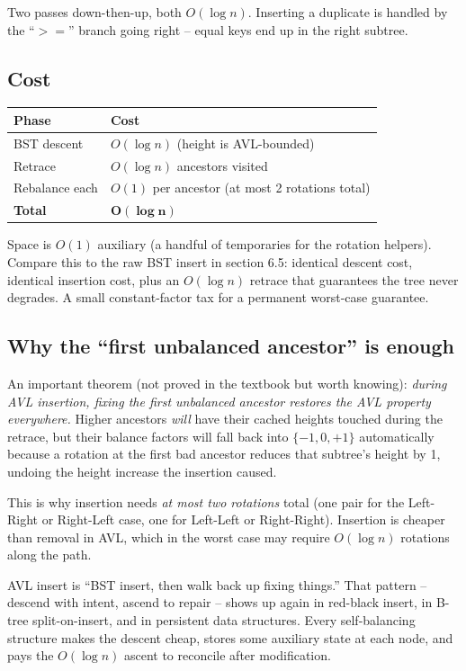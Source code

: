 \documentclass[11pt]{article}
\begin{document}
Two passes down-then-up, both $O(\log n)$. Inserting a duplicate is handled by the ``$>=$'' branch going right -- equal keys end up in the right subtree.

\subsection*{Cost}

\begin{center}
\begin{tabular}{ll}
Phase          & Cost \\
\hline
BST descent    & $O(\log n)$ (height is AVL-bounded) \\
Retrace        & $O(\log n)$ ancestors visited \\
Rebalance each & $O(1)$ per ancestor (at most 2 rotations total) \\
\hline
\textbf{Total} & $\mathbf{O(\log n)}$ \\
\end{tabular}
\end{center}

Space is $O(1)$ auxiliary (a handful of temporaries for the rotation helpers). Compare this to the raw BST insert in section 6.5: identical descent cost, identical insertion cost, plus an $O(\log n)$ retrace that guarantees the tree never degrades. A small constant-factor tax for a permanent worst-case guarantee.

\subsection*{Why the ``first unbalanced ancestor'' is enough}

An important theorem (not proved in the textbook but worth knowing): \emph{during AVL insertion, fixing the first unbalanced ancestor restores the AVL property everywhere.} Higher ancestors \emph{will} have their cached heights touched during the retrace, but their balance factors will fall back into $\{-1, 0, +1\}$ automatically because a rotation at the first bad ancestor reduces that subtree's height by 1, undoing the height increase the insertion caused.

This is why insertion needs \emph{at most two rotations} total (one pair for the Left-Right or Right-Left case, one for Left-Left or Right-Right). Insertion is cheaper than removal in AVL, which in the worst case may require $O(\log n)$ rotations along the path.

\begin{ideabox}
AVL insert is ``BST insert, then walk back up fixing things.'' That pattern -- descend with intent, ascend to repair -- shows up again in red-black insert, in B-tree split-on-insert, and in persistent data structures. Every self-balancing structure makes the descent cheap, stores some auxiliary state at each node, and pays the $O(\log n)$ ascent to reconcile after modification.
\end{ideabox}
\end{document}
